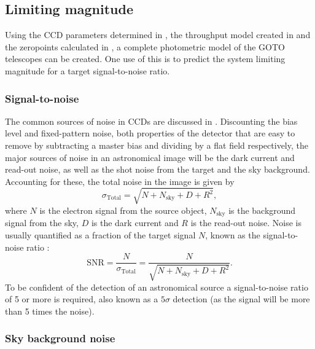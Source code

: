 
\subsection{Limiting magnitude}
\label{sec:lim_mag}
\begin{colsection}

Using the CCD parameters determined in , the throughput model created in  and the zeropoints calculated in , a complete photometric model of the GOTO telescopes can be created. One use of this is to predict the system limiting magnitude for a target signal-to-noise ratio.

\subsubsection{Signal-to-noise}

The common sources of noise in CCDs are discussed in . Discounting the bias level and fixed-pattern noise, both properties of the detector that are easy to remove by subtracting a master bias and dividing by a flat field respectively, the major sources of noise in an astronomical image will be the dark current and read-out noise, as well as the shot noise from the target and the sky background. Accounting for these, the total noise in the image is given by
%
\begin{equation}
    \sigma_\text{Total} = \sqrt{N + N_\text{sky} + D + R^2},
    \label{eq:total_noise}
\end{equation}
%
where $N$ is the electron signal from the source object, $N_\text{sky}$ is the background signal from the sky, $D$ is the dark current and $R$ is the read-out noise. Noise is usually quantified as a fraction of the target signal $N$, known as the signal-to-noise ratio :
%
\begin{equation}
    \text{SNR} = \frac{N}{\sigma_\text{Total}} = \frac{N}{\sqrt{N + N_\text{sky} + D + R^2}}.
    \label{eq:snr}
\end{equation}
%
To be confident of the detection of an astronomical source a signal-to-noise ratio of 5 or more is required, also known as a $5\sigma$ detection (as the signal will be more than 5 times the noise).

\newpage

\subsubsection{Sky background noise}


\end{colsection}
